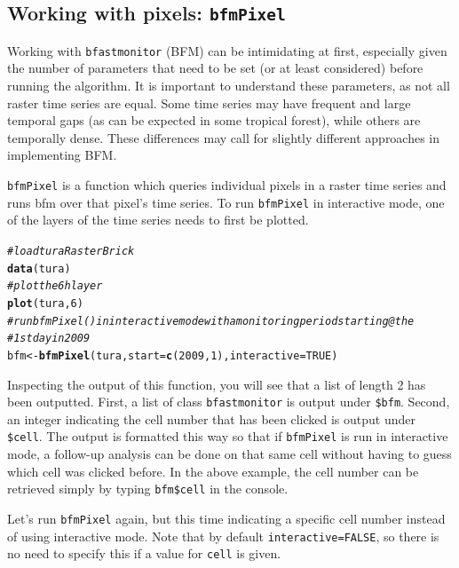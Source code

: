 \documentclass{article}\usepackage[]{graphicx}\usepackage[]{color}
\makeatletter
\newcommand{\hlnum}[1]{\textcolor[rgb]{0.686,0.059,0.569}{#1}}%
\newcommand{\hlcom}[1]{\textcolor[rgb]{0.678,0.584,0.686}{\textit{#1}}}%
\newcommand{\hlstd}[1]{\textcolor[rgb]{0.345,0.345,0.345}{#1}}%
\newcommand{\hlkwb}[1]{\textcolor[rgb]{0.69,0.353,0.396}{#1}}%
\newcommand{\hlkwc}[1]{\textcolor[rgb]{0.333,0.667,0.333}{#1}}%
\newcommand{\hlkwd}[1]{\textcolor[rgb]{0.737,0.353,0.396}{\textbf{#1}}}%
\newenvironment{kframe}{%
 \def\at@end@of@kframe{}%
 \ifinner\ifhmode%
  \def\at@end@of@kframe{\end{minipage}}%
  \begin{minipage}{\columnwidth}%
 \fi\fi%
 \def\FrameCommand##1{\hskip\@totalleftmargin \hskip-\fboxsep
 \colorbox{shadecolor}{##1}\hskip-\fboxsep
     \hskip-\linewidth \hskip-\@totalleftmargin \hskip\columnwidth}%
 \MakeFramed {\advance\hsize-\width
   \@totalleftmargin\z@ \linewidth\hsize
   \@setminipage}}%
 {\par\unskip\endMakeFramed%
 \at@end@of@kframe}
\newenvironment{knitrout}{}{} %
\def\code#1{\texttt{#1}}
\makeatother
\begin{document}
\subsection{Working with pixels: \code{bfmPixel}}

Working with \code{bfastmonitor} (BFM) can be intimidating at first, especially given the number of parameters that need to be set (or at least considered) before running the algorithm. It is important to understand these parameters, as not all raster time series are equal. Some time series may have frequent and large temporal gaps (as can be expected in some tropical forest), while others are temporally dense. These differences may call for slightly different approaches in implementing BFM.

\code{bfmPixel} is a function which queries individual pixels in a raster time series and runs bfm over that pixel's time series. To run \code{bfmPixel} in interactive mode, one of the layers of the time series needs to first be plotted.

\begin{knitrout}
\color{fgcolor}\begin{kframe}
\begin{alltt}
\hlcom{# load tura RasterBrick}
\hlkwd{data}\hlstd{(tura)}
\hlcom{# plot the 6h layer}
\hlkwd{plot}\hlstd{(tura,} \hlnum{6}\hlstd{)}
\hlcom{# run bfmPixel() in interactive mode with a monitoring period starting @ the}
\hlcom{# 1st day in 2009}
\hlstd{bfm} \hlkwb{<-} \hlkwd{bfmPixel}\hlstd{(tura,} \hlkwc{start} \hlstd{=} \hlkwd{c}\hlstd{(}\hlnum{2009}\hlstd{,} \hlnum{1}\hlstd{),} \hlkwc{interactive} \hlstd{=} \hlnum{TRUE}\hlstd{)}
\end{alltt}
\end{kframe}
\end{knitrout}


Inspecting the output of this function, you will see that a list of length 2 has been outputted. First, a list of class \code{bfastmonitor} is output under \code{\$bfm}. Second, an integer indicating the cell number that has been clicked is output under \code{\$cell}. The output is formatted this way so that if \code{bfmPixel} is run in interactive mode, a follow-up analysis can be done on that same cell without having to guess which cell was clicked before. In the above example, the cell number can be retrieved simply by typing \code{bfm\$cell} in the console.

Let's run \code{bfmPixel} again, but this time indicating a specific cell number instead of using interactive mode. Note that by default \code{interactive=FALSE}, so there is no need to specify this if a value for \code{cell} is given.
\end{document}
